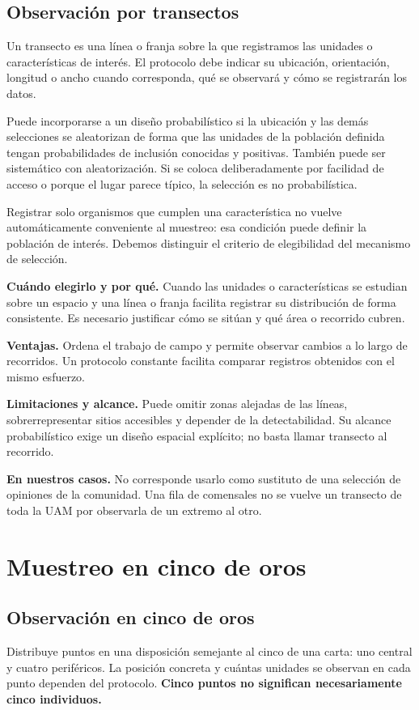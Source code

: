 \documentclass[11pt,letterpaper]{article}
\begin{document}
\subsection{Observación por transectos}
Un transecto es una línea o franja sobre la que registramos las unidades o características de interés. El protocolo debe indicar su ubicación, orientación, longitud o ancho cuando corresponda, qué se observará y cómo se registrarán los datos.

Puede incorporarse a un diseño probabilístico si la ubicación y las demás selecciones se aleatorizan de forma que las unidades de la población definida tengan probabilidades de inclusión conocidas y positivas. También puede ser sistemático con aleatorización. Si se coloca deliberadamente por facilidad de acceso o porque el lugar parece típico, la selección es no probabilística.

Registrar solo organismos que cumplen una característica no vuelve automáticamente conveniente al muestreo: esa condición puede definir la población de interés. Debemos distinguir el criterio de elegibilidad del mecanismo de selección.

\textbf{Cuándo elegirlo y por qué.} Cuando las unidades o características se estudian sobre un espacio y una línea o franja facilita registrar su distribución de forma consistente. Es necesario justificar cómo se sitúan y qué área o recorrido cubren.

\textbf{Ventajas.} Ordena el trabajo de campo y permite observar cambios a lo largo de recorridos. Un protocolo constante facilita comparar registros obtenidos con el mismo esfuerzo.

\textbf{Limitaciones y alcance.} Puede omitir zonas alejadas de las líneas, sobrerrepresentar sitios accesibles y depender de la detectabilidad. Su alcance probabilístico exige un diseño espacial explícito; no basta llamar transecto al recorrido.

\textbf{En nuestros casos.} No corresponde usarlo como sustituto de una selección de opiniones de la comunidad. Una fila de comensales no se vuelve un transecto de toda la UAM por observarla de un extremo al otro.
\clearpage
\section{Muestreo en cinco de oros}

\subsection{Observación en cinco de oros}
Distribuye puntos en una disposición semejante al cinco de una carta: uno central y cuatro periféricos. La posición concreta y cuántas unidades se observan en cada punto dependen del protocolo. \textbf{Cinco puntos no significan necesariamente cinco individuos.}
\end{document}
